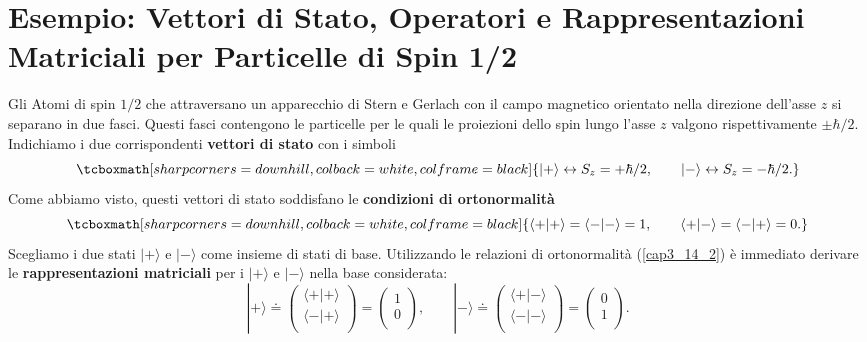 \section[Esempio:Particelle di Spin 1/2]{Esempio: Vettori di Stato, Operatori e Rappresentazioni Matriciali per Particelle di Spin 1/2}
Gli Atomi di spin $1/2$ che attraversano un apparecchio di Stern e Gerlach con il campo magnetico orientato nella direzione dell'asse $z$ si separano in due fasci. Questi fasci contengono le particelle per le quali le proiezioni dello spin lungo l'asse $z$ valgono rispettivamente $\pm \hbar/2$. Indichiamo i due corrispondenti \textbf{vettori di stato} con i simboli
	\begin{equation}
		\tcboxmath[sharp corners=downhill, colback=white, colframe=black]{
		| + \rangle \leftrightarrow S_z= +\hbar/2, \qquad | - \rangle \leftrightarrow S_z=-\hbar/2 .
		}
	\label{cap3_14}
	\end{equation}
Come abbiamo visto, questi vettori di stato soddisfano le \textbf{condizioni di ortonormalità}
	\begin{equation}
		\tcboxmath[sharp corners=downhill, colback=white, colframe=black]{
			\langle + | + \rangle = \langle - | - \rangle =1,\qquad \langle + | - \rangle = \langle - | + \rangle =0 .
			}
	\label{cap3_14_2}
	\end{equation}
Scegliamo i due stati $| + \rangle $ e $ | - \rangle$ come insieme di stati di base. Utilizzando le relazioni di ortonormalità (\ref{cap3_14_2}) è immediato derivare le \textbf{rappresentazioni matriciali} per i $| + \rangle$ e $| - \rangle$ nella base considerata:
	\begin{equation}
		| + \rangle \doteq
		\begin{pmatrix}
		\langle + | + \rangle \\
		\langle - | + \rangle \\
		\end{pmatrix} = 
		\begin{pmatrix}
		1 \\
		0 \\
		\end{pmatrix}, \qquad
		| - \rangle \doteq
		\begin{pmatrix}
		\langle + | - \rangle \\
		\langle - | - \rangle \\
		\end{pmatrix} = 
		\begin{pmatrix}
		0 \\
		1 \\
		\end{pmatrix} .
	\end{equation}
